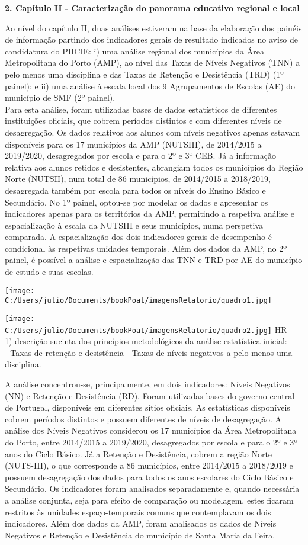 \documentclass[
]{book}
\begin{document}
\textbf{2. Capítulo II - Caracterização do panorama educativo regional e local }

Ao nível do capítulo II, duas análises estiveram na base da elaboração dos painéis de informação partindo dos indicadores gerais de resultado indicados no aviso de candidatura do PIICIE: i) uma análise regional dos municípios da Área Metropolitana do Porto (AMP), ao nível das Taxas de Níveis Negativos (TNN) a pelo menos uma disciplina e das Taxas de Retenção e Desistência (TRD) (1º painel); e ii) uma análise à escala local dos 9 Agrupamentos de Escolas (AE) do município de SMF (2º painel).\\
Para esta análise, foram utilizadas bases de dados estatísticos de diferentes instituições oficiais, que cobrem períodos distintos e com diferentes níveis de desagregação. Os dados relativos aos alunos com níveis negativos apenas estavam disponíveis para os 17 municípios da AMP (NUTSIII), de 2014/2015 a 2019/2020, desagregados por escola e para o 2º e 3º CEB. Já a informação relativa aos alunos retidos e desistentes, abrangiam todos os municípios da Região Norte (NUTSII), num total de 86 municípios, de 2014/2015 a 2018/2019, desagregada também por escola para todos os níveis do Ensino Básico e Secundário. No 1º painel, optou-se por modelar os dados e apresentar os indicadores apenas para os territórios da AMP, permitindo a respetiva análise e espacialização à escala da NUTSIII e seus municípios, numa perspetiva comparada. A espacialização dos dois indicadores gerais de desempenho é condicional às respetivas unidades temporais. Além dos dados da AMP, no 2º painel, é possível a análise e espacialização das TNN e TRD por AE do município de estudo e suas escolas.

\texttt{[image: C:/Users/julio/Documents/bookPoat/imagensRelatorio/quadro1.jpg]}

\texttt{[image: C:/Users/julio/Documents/bookPoat/imagensRelatorio/quadro2.jpg]}
HR -- 1) descrição sucinta dos princípios metodológicos da análise estatística inicial:\\
- Taxas de retenção e desistência
- Taxas de níveis negativos a pelo menos uma disciplina.

A análise concentrou-se, principalmente, em dois indicadores: Níveis Negativos (NN) e Retenção e Desistência (RD). Foram utilizadas bases do governo central de Portugal, disponíveis em diferentes sítios oficiais. As estatísticas disponíveis cobrem períodos distintos e possuem diferentes de níveis de desagregação. A análise dos Níveis Negativos considerou os 17 municípios da Área Metropolitana do Porto, entre 2014/2015 a 2019/2020, desagregados por escola e para o 2º e 3º anos do Ciclo Básico. Já a Retenção e Desistência, cobrem a região Norte (NUTS-III), o que corresponde a 86 municípios, entre 2014/2015 a 2018/2019 e possuem desagregação dos dados para todos os anos escolares do Ciclo Básico e Secundário. Os indicadores foram analisados separadamente e, quando necessária a análise conjunta, seja para efeito de comparação ou modelagem, estes ficaram restritos às unidades espaço-temporais comuns que contemplavam os dois indicadores. Além dos dados da AMP, foram analisados os dados de Níveis Negativos e Retenção e Desistência do município de Santa Maria da Feira.
\end{document}
